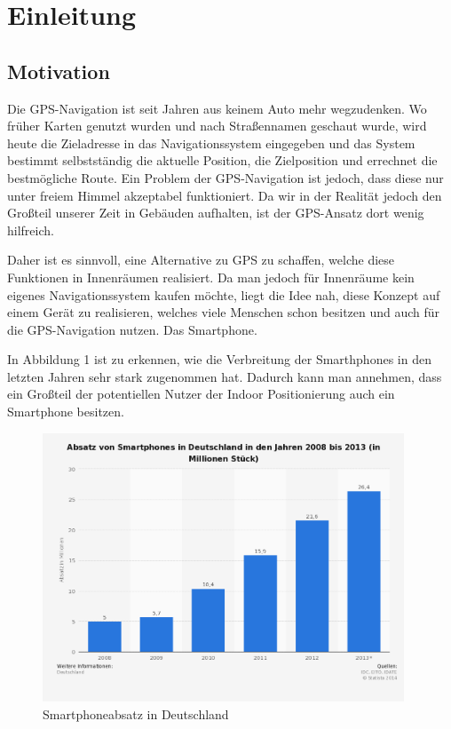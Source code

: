 \chapter{Einleitung}
\label{chap:introduction}

\section{Motivation}
\label{sec:introduction:motivation}

Die GPS-Navigation ist seit Jahren aus keinem Auto mehr wegzudenken. Wo früher Karten genutzt wurden und nach Straßennamen geschaut wurde, wird heute die Zieladresse in das Navigationssystem eingegeben und das System bestimmt selbstständig die aktuelle Position, die Zielposition und errechnet die bestmögliche Route.
Ein Problem der GPS-Navigation ist jedoch, dass diese nur unter freiem Himmel akzeptabel funktioniert.
Da wir in der Realität jedoch den Großteil unserer Zeit in Gebäuden aufhalten, ist der GPS-Ansatz dort wenig hilfreich.

Daher ist es sinnvoll, eine Alternative zu GPS zu schaffen, welche diese Funktionen in Innenräumen realisiert.
Da man jedoch für Innenräume kein eigenes Navigationssystem kaufen möchte, liegt die Idee nah, diese Konzept auf einem Gerät zu realisieren, welches viele Menschen schon besitzen und auch für die GPS-Navigation nutzen. 
Das Smartphone.

In Abbildung 1 ist zu erkennen, wie die Verbreitung der Smarthphones in den letzten Jahren sehr stark zugenommen hat. Dadurch kann man annehmen, dass ein Großteil der potentiellen Nutzer der Indoor Positionierung auch ein Smartphone besitzen.
\begin{figure}[htb]
	\centering
		\includegraphics[height=8cm]{pictures/statistik-smartphonenutzung.png}
		\caption{Smartphoneabsatz in Deutschland}
\end{figure}

